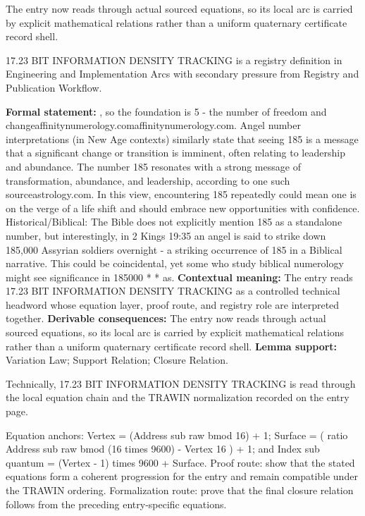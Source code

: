 The entry now reads through actual sourced equations, so its local arc is carried by explicit mathematical relations rather than a uniform quaternary certificate record shell.
\clearpage


\begingroup\small
{}
17.23 BIT INFORMATION DENSITY TRACKING is a registry definition in Engineering and Implementation Arcs with secondary pressure from Registry and Publication Workflow.

\begingroup\footnotesize\setlength{\emergencystretch}{3em}\sloppy
\textbf{Formal statement:} , so the foundation is 5 - the number of freedom and changeaffinitynumerology.comaffinitynumerology.com. Angel number interpretations (in New Age contexts) similarly state that seeing 185 is a message that a significant change or transition is imminent, often relating to leadership and abundance. The number 185 resonates with a strong message of transformation, abundance, and leadership, according to one such sourceastrology.com. In this view, encountering 185 repeatedly could mean one is on the verge of a life shift and should embrace new opportunities with confidence. Historical/Biblical: The Bible does not explicitly mention 185 as a standalone number, but interestingly, in 2 Kings 19:35 an angel is said to strike down 185,000 Assyrian soldiers overnight - a striking occurrence of 185 in a Biblical narrative. This could be coincidental, yet some who study biblical numerology might see significance in 185000 * * as. \textbf{Contextual meaning:} The entry reads 17.23 BIT INFORMATION DENSITY TRACKING as a controlled technical headword whose equation layer, proof route, and registry role are interpreted together. \textbf{Derivable consequences:} The entry now reads through actual sourced equations, so its local arc is carried by explicit mathematical relations rather than a uniform quaternary certificate record shell. \textbf{Lemma support:} Variation Law; Support Relation; Closure Relation.\par
\endgroup

Technically, 17.23 BIT INFORMATION DENSITY TRACKING is read through the local equation chain and the TRAWIN normalization recorded on the entry page.

Equation anchors: Vertex = (Address sub raw bmod 16) + 1; Surface = ( ratio Address sub raw bmod (16 times 9600) - Vertex 16 ) + 1; and Index sub quantum = (Vertex - 1) times 9600 + Surface. Proof route: show that the stated equations form a coherent progression for the entry and remain compatible under the TRAWIN ordering. Formalization route: prove that the final closure relation follows from the preceding entry-specific equations.

